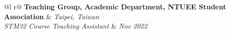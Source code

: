 \begin{tabularx}{\linewidth}{@{}l r@{}}
    \textbf{Teaching Group, Academic Department, NTUEE Student Association} & \textit{Taipei, Taiwan} \\
    \textit{STM32 Course Teaching Assistant} & \textit{Nov 2022} \\
\end{tabularx}
